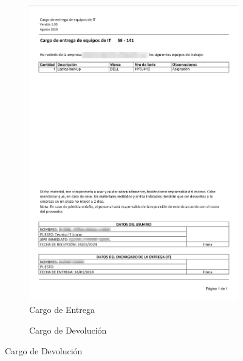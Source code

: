 \documentclass[stu, 12pt, letterpaper, donotrepeattitle, floatsintext, natbib]{apa7}
\begin{document}
\begin{figure}[h]
    \caption{Cargos de Movimientos}\label{cargos}
    \centering
    \begin{subfigure}[b]{0.3\textwidth}
        \centering
        \caption{Cargo de Entrega}\label{cargoEntrega}
        \includegraphics[width=\textwidth]{./images/reporteEntrega.png}
    \end{subfigure}
    \hfill
    \begin{subfigure}[b]{0.3\textwidth}
        \centering
        \caption{Cargo de Devoluci\'on}\label{cargoDevolucion}

\end{subfigure}
\end{figure}
\end{document}
